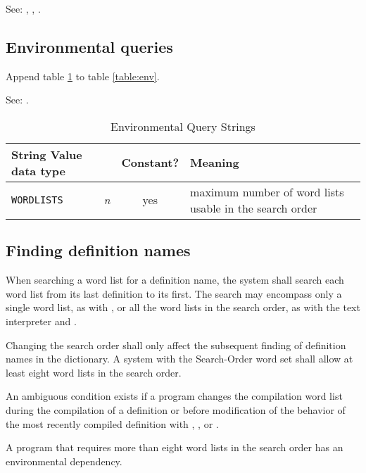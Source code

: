 See: ,
,
.

\subsection{Environmental queries} %

Append table \ref{search:env} to table \ref{table:env}.

See: .

\begin{table}[ht]
  \begin{center}
	\caption{Environmental Query Strings}
	\label{search:env}
	\begin{tabular}{p{10em}rcp{}}
		\hline\hline
		\multicolumn{2}{l}{String \hfill Value data type} & Constant? & Meaning \\
		\hline
		\texttt{WORDLISTS}			& \emph{n}		& yes	&
			maximum number of word lists usable in the search order\\
		\hline\hline
	\end{tabular}
  \end{center}
\end{table}

\subsection{Finding definition names} %
\label{search:find}

When searching a word list for a definition name, the system shall
search each word list from its last definition to its first. The
search may encompass only a single word list, as with
, or all the word lists in the search order,
as with the text interpreter and .

Changing the search order shall only affect the subsequent finding
of definition names in the dictionary. A system with the Search-Order
word set shall allow at least eight word lists in the search order.

An ambiguous condition exists if a program changes the compilation
word list during the compilation of a definition or before
modification of the behavior of the most recently compiled definition
with , , or
.

A program that requires more than eight word lists in the search
order has an environmental dependency.

